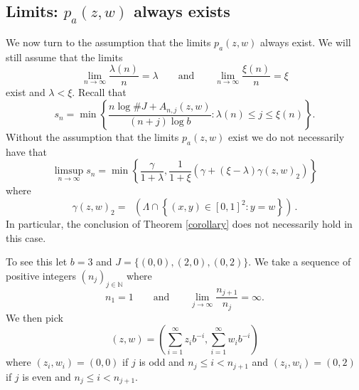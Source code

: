 \documentclass[12pt]{article}
\theoremstyle{remark}
\numberwithin{equation}{section}
\renewcommand{\Bbb}[1]{\mathbb{#1}}
\newcommand{\N}{{\Bbb N}}         %
\newcommand{\0}{\mathbf{0}}
\DeclareMathOperator{\dimh}{\dim_H}
\begin{document}
\subsection{Limits: $p_{a}(z,w)$ always exists}

We now turn to the assumption that the limits $p_a(z,w)$ always exist. We will still assume that the limits
\[\lim_{n\to\infty}\frac{\lambda(n)}{n}=\lambda \qquad \text{and} \qquad \lim_{n\to\infty}\frac{\xi(n)}{n}=\xi\]
exist and $\lambda < \xi$. Recall that
$$ s_n=\min\left\{\frac{n\log\#J+A_{n,j}(z,w)}{(n+j)\log{b}}:\lambda(n)\leq j\leq\xi(n)\right\}.$$
Without the assumption that the limits $p_{a}(z,w)$ exist we do not necessarily have that
$$\limsup_{n\to\infty} s_n=\min\left\{\frac{\gamma}{1+\lambda},\frac{1}{1+\xi}\left(\gamma+(\xi-\lambda)\gamma(z,w)_{2} \right)\right\}$$
where
\begin{equation*}
    \gamma(z,w)_{2} =\dimh \left(\Lambda \cap \left\{(x,y) \in [0,1]^{2} : y=w\right\}\right)\, .
\end{equation*}
 In particular, the conclusion of Theorem \ref{corollary} does not necessarily hold in this case.

To see this let $b=3$ and $J=\{(0,0),(2,0),(0,2)\}$. We take a sequence of positive integers $(n_j)_{j\in\N}$ where 
\[n_1=1 \qquad \text{and} \qquad \lim_{j\to\infty}\frac{n_{j+1}}{n_j}=\infty.\]
We then pick \[(z,w)=\left(\sum_{i=1}^{\infty}z_ib^{-i},\sum_{i=1}^{\infty}w_ib^{-i}\right)\] where $(z_i,w_i)=(0,0)$ if $j$ is odd and $n_j\leq i<n_{j+1}$ and $(z_i,w_i)=(0,2)$ if $j$ is even and \mbox{$n_j\leq i<n_{j+1}$}. 
\end{document}
